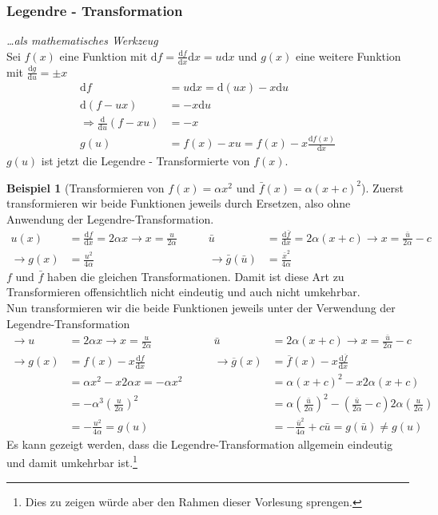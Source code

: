 \documentclass[oneside]{book}
\theoremstyle{definition}
\newtheorem*{beispiel*}{Beispiel}
\renewcommand{\d}{\mathrm d}
\newcommand{\md}{\d}
\begin{document}
\subsubsection{Legendre - Transformation} \textit{\dots als mathematisches Werkzeug}\\
Sei $f(x)$ eine Funktion mit $\md f = \frac{\md f}{\md x} \md x = u \md x$ und $g(x)$ eine weitere Funktion mit $\frac{\md g}{\md u} = \pm x$
\begin{align*}
\md f &= u\md x = \md (ux) - x\md u\\
\md (f-ux) &= - x \md u\\
\Rightarrow \frac{\md}{\md u}(f-xu) &= -x\\
g(u) &= f(x) - xu = f(x) - x\frac{\md f(x)}{\md x}
\end{align*}
$g(u)$ ist jetzt die Legendre - Transformierte von $f(x)$.
	
	
	
\begin{beispiel*}[Transformieren von $f(x) = \alpha x^2$ und $\bar{f}(x) = \alpha(x+c)^2$]
	Zuerst transformieren wir beide Funktionen jeweils durch Ersetzen, also ohne Anwendung der Legendre-Transformation.
\begin{align*}
u(x) &= \frac{\md f}{\md x} = 2 \alpha x \rightarrow x= \frac{u}{2\alpha} & \qquad   \bar u &= \frac{\md \bar f}{\md x} = 2\alpha(x+c) \rightarrow x=\frac{\bar u}{2\alpha} - c\\
\rightarrow g(x) &= \frac{u^2}{4\alpha} & \qquad  \rightarrow \bar g(\bar u) &= \frac{\bar x^2}{4\alpha}
\end{align*}
$f$ und $\bar f$ haben die gleichen Transformationen. Damit ist diese Art zu Transformieren offensichtlich nicht eindeutig und auch nicht umkehrbar.\\
Nun transformieren wir die beide Funktionen jeweils unter der Verwendung der Legendre-Transformation
\begin{align*}
\rightarrow u &= 2\alpha x \rightarrow x= \frac {u}{2\alpha}      &  \qquad \bar{u} &= 2\alpha (x+c) \rightarrow x= \frac {\bar{u}}{2\alpha} -c\\
\rightarrow g(x) &= f(x) - x\frac{\md f}{\md x}  &  \qquad   \rightarrow \overline g(x) &= \overline f(x) - x\frac{\md \overline f}{\md x}\\
&= \alpha x^2 - x2\alpha x = -\alpha x^2         &    \qquad    &= \alpha (x+c)^2 - x 2\alpha( x+c)\\
&=-\alpha^3(\frac{u}{2\alpha})^2      &  \qquad    &= \alpha (\frac {\bar{u}}{2\alpha})^2 - (\frac {\bar u}{2\alpha} -c) 2\alpha( \frac {u}{2\alpha} )\\
&= -\frac{u^2}{4\alpha} = g(u)   &  \qquad    &= -\frac {\bar{u}^2}{4\alpha} +c\bar{u} = g(\bar{u}) \neq g(u)
\end{align*}
Es kann gezeigt werden, dass die Legendre-Transformation allgemein eindeutig und damit umkehrbar ist.\footnote{Dies zu zeigen würde aber den Rahmen dieser Vorlesung sprengen.}
\end{beispiel*}
\end{document}
